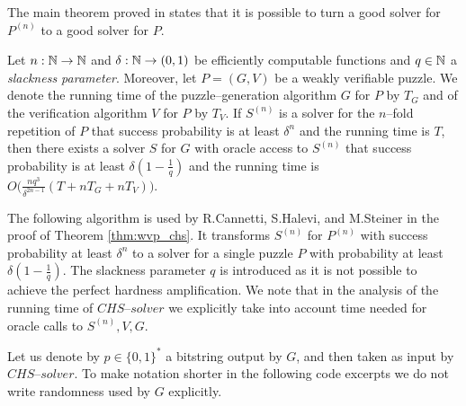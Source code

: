 The main theorem proved in \cite{canetti2004hardness} states that it is possible to turn a good solver for $P^{(n)}$ to a good solver for $P$.
%
\begin{theorem}
  \label{thm:wvp_chs}
Let $n:\mathbb{N} \rightarrow \mathbb{N}$ and $\delta: \mathbb{N} \rightarrow (0,1)$ be efficiently computable functions and $q \in \mathbb{N}$ a \textit{slackness parameter}.
Moreover, let $P = (G,V)$ be a weakly verifiable puzzle. We denote the running time of the
puzzle--generation algorithm $G$ for $P$ by $T_G$ and of the verification algorithm $V$ for $P$ by $T_V$.
If $S^{(n)}$ is a solver for the $n$--fold repetition of $P$ that success probability is at least $\delta^{n}$
and the running time is $T$, then there exists a solver $S$ for $G$ with oracle access to $S^{(n)}$ that success
probability is at least $\delta(1-\frac{1}{q})$ and the running time is $O\Big(\frac{nq^3}{\delta^{2n-1}}(T + nT_G + nT_V)\Big)$.
\end{theorem}
%
The following algorithm is used by R.Cannetti, S.Halevi, and M.Steiner in the proof of Theorem \ref{thm:wvp_chs}.
It transforms $S^{(n)}$ for $P^{(n)}$ with success probability at least $\delta^{n}$ to a solver for a single puzzle $P$ with probability
at least $\delta(1  - \frac{1}{q})$. The slackness parameter $q$ is introduced as it is not possible to achieve
the perfect hardness amplification. We note that in the analysis of the running time of $\mathit{CHS\text{--}solver}$
we explicitly take into account time needed for oracle calls to $S^{(n)}, V, G$.

Let us denote by $p \in \{0,1\}^{*}$ a bitstring output by $G$, and then taken as input by $\mathit{CHS\text{--}solver}$.
To make notation shorter in the following code excerpts we do not write randomness used by $G$ explicitly.

